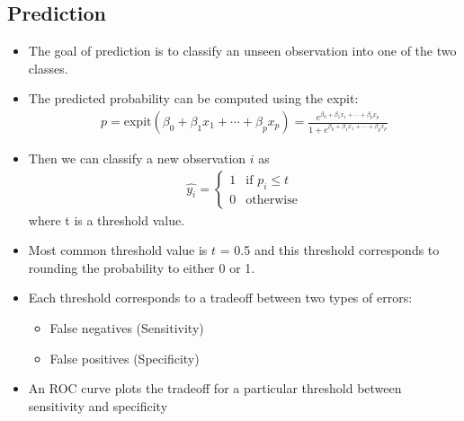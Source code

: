 \documentclass[12pt, oneside]{article}
\begin{document}
\subsection{Prediction}
\begin{itemize}
    \item The goal of prediction is to classify an unseen observation into one of the two classes.
    \item The predicted probability can be computed using the expit:
    \begin{align*}
        p = \text{expit}(\beta_0 + \beta_1x_1 + \dotsb + \beta_px_p) = \frac{e^{\beta_0 + \beta_1x_1 + \dotsb + \beta_px_p}}{1 + e^{\beta_0 + \beta_1x_1 + \dotsb + \beta_px_p}}
    \end{align*}
    \item Then we can classify a new observation $i$ as
    \begin{align*}
        \widehat{y_i} = \begin{cases}
        1 & \text{if } p_i \leq t \\
        0 & \text{otherwise}
        \end{cases}
    \end{align*}
    where t is a threshold value.
    \item Most common threshold value is $t$ = 0.5 and this threshold corresponds to rounding the probability to either 0 or 1.
    \item Each threshold corresponds to a tradeoff between two types of errors:
    \begin{itemize}
        \item False negatives (Sensitivity)
        \item False positives (Specificity)
    \end{itemize}
    \item An ROC curve plots the tradeoff for a particular threshold between sensitivity and specificity
\end{itemize}
\end{document}
